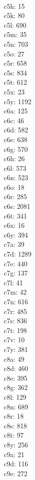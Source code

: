 \begin{multicols}{8}
  \\c5h: 15
  \\c5k: 80
  \\c5l: 690
  \\c5m: 35
  \\c5n: 703
  \\c5o: 27
  \\c5r: 658
  \\c5s: 834
  \\c5t: 612
  \\c5x: 23
  \\c5y: 1192
  \\c6a: 125
  \\c6c: 46
  \\c6d: 582
  \\c6e: 638
  \\c6g: 570
  \\c6h: 26
  \\c6l: 573
  \\c6n: 523
  \\c6o: 18
  \\c6r: 285
  \\c6s: 2081
  \\c6t: 341
  \\c6x: 16
  \\c6y: 394
  \\c7a: 39
  \\c7d: 1289
  \\c7e: 440
  \\c7g: 137
  \\c7l: 41
  \\c7m: 42
  \\c7n: 616
  \\c7r: 485
  \\c7s: 836
  \\c7t: 198
  \\c7v: 10
  \\c7y: 381
  \\c8a: 49
  \\c8d: 460
  \\c8e: 395
  \\c8g: 362
  \\c8l: 129
  \\c8n: 689
  \\c8r: 18
  \\c8s: 818
  \\c8t: 97
  \\c8y: 256
  \\c9a: 21
  \\c9d: 116
  \\c9e: 272

\end{multicols}
